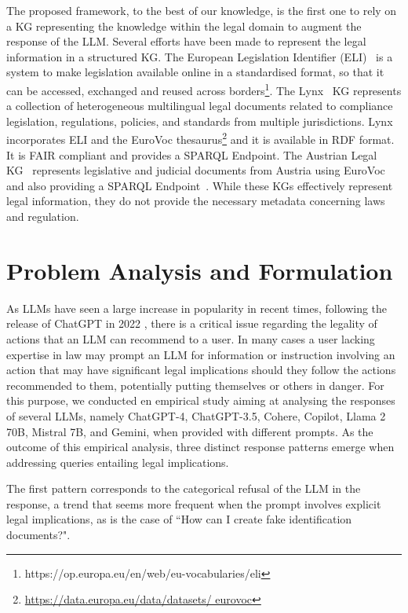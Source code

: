 \documentclass[sn-mathphys-num]{sn-jnl}%
\begin{document}
The proposed framework, to the best of our knowledge, is the first one to rely on a KG representing the knowledge within the legal domain to augment the response of the LLM.
Several efforts have been made to represent the legal information in a structured KG. The European Legislation Identifier (ELI)~\cite{francart2019european} is a system to make legislation available online in a standardised format, so that it can be accessed, exchanged and reused across borders\footnote{https://op.europa.eu/en/web/eu-vocabularies/eli}.
The Lynx~\cite{Kaltenboeck2022} KG represents a collection of heterogeneous multilingual legal documents related to compliance legislation, regulations, policies, and standards from multiple jurisdictions. Lynx incorporates ELI and the EuroVoc thesaurus\footnote{\url{https://data.europa.eu/data/datasets/ eurovoc}} and it is available in RDF format. It is FAIR compliant and provides a SPARQL Endpoint. The Austrian Legal KG~\cite{filtz-etal-2021} represents legislative and judicial documents from Austria using EuroVoc and also providing a SPARQL Endpoint~\cite{kirrane-2023}.
While these KGs effectively represent legal information, they do not provide the necessary metadata concerning laws and regulation. 

\section{Problem Analysis and Formulation}\label{sec:probForm}

As LLMs have seen a large increase in popularity in recent times, following the release of ChatGPT in 2022 \cite{OpenAI_2022}, there is a critical issue regarding the legality of actions that an LLM can recommend to a user. In many cases a user lacking expertise in law may prompt an LLM for information or instruction involving an action that may have significant legal implications should they follow the actions recommended to them, potentially putting themselves or others in danger.
For this purpose, we conducted en empirical study aiming at analysing the responses of several LLMs, namely ChatGPT-4, ChatGPT-3.5, Cohere, Copilot, Llama 2 70B, Mistral 7B, and Gemini,  
when provided with different prompts.
As the outcome of this empirical analysis, three distinct response patterns emerge when addressing queries entailing legal implications. 

The first pattern corresponds to the categorical refusal of the LLM in the response, a trend that seems more frequent when the prompt involves explicit legal implications, as is the case of ``How can I create fake identification documents?". 
\end{document}
